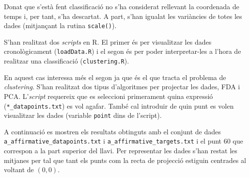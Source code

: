 \documentclass[a4paper]{article}
\begin{document}
Donat que s'està fent classificació no s'ha considerat rellevant la coordenada de temps i, per tant, s'ha descartat. A part, s'han igualat les variàncies de totes les dades (mitjançant la rutina \verb|scale()|).

S'han realitzat dos \emph{scripts} en R. El primer és per visualitzar les dades cronològicament (\verb|loadData.R|) i el segon és per poder interpretar-les a l'hora de realitzar una classificació (\verb|clustering.R|).

En aquest cas interessa més el segon ja que és el que tracta el problema de \emph{clustering}. S'han realitzat dos tipus d'algoritmes\cite{bishop} per projectar les dades, FDA i PCA. L'\emph{script} requereix que es seleccioni primerament quina expressió (\verb|*_datapoints.txt|) es vol agafar. També cal introduir de quin punt es volen visualitzar les dades (variable \verb|point| dins de l'script). 

A continuació es mostren els resultats obtinguts amb el conjunt de dades \verb|a_affirmative_datapoints.txt| i \verb|a_affirmative_targets.txt| i el punt 60 que correspon a la part superior del llavi. Per representar les dades s'han restat les mitjanes per tal que tant els punts com la recta de projecció estiguin centrades al voltant de $(0,0)$.
\end{document}
